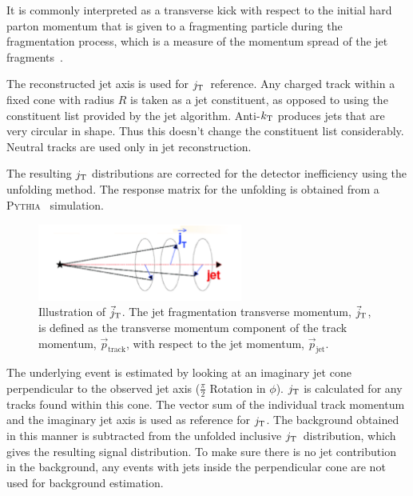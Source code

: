It is commonly interpreted as a transverse kick with respect to the initial hard parton momentum that is given to a fragmenting particle during the fragmentation process, which is a measure of the momentum spread of the jet fragments~\cite{}. 

The reconstructed jet axis is used for $j_{\rm T}$ reference. Any charged track within a fixed cone with radius $R$ is taken as a jet constituent, as opposed to using the constituent list provided by the jet algorithm. Anti-$k_{\rm T}$ produces jets that are very circular in shape. Thus this doesn't change the constituent list considerably. Neutral tracks are used only in jet reconstruction.
 
The resulting $j_{\rm T}$ distributions are corrected for the detector inefficiency using the unfolding method. The response matrix for the unfolding is obtained from a \textsc{Pythia}~\cite{introPythia81} simulation.
 
   \begin{figure}
    \begin{center}
      \includegraphics[width = 0.60\textwidth]{figures/jt_def}
    \end{center}
    \caption{Illustration of $\vec{j}_{\rm T}$. The jet fragmentation transverse momentum, $\vec{j}_{\rm T}$, is defined as the transverse momentum component of the track momentum, $\vec{p}_{\mathrm{track}}$, with respect to the jet momentum, $\vec{p}_{\mathrm{jet}}$.}
    \label{fig:jtdefinition}
  \end{figure}
 
The underlying event is estimated by looking at an imaginary jet cone perpendicular to the observed jet axis ($\frac{\pi}{2}$ Rotation in $\phi$). $j_{\rm T}$ is calculated for any tracks found within this cone. The vector sum of the individual track momentum and the imaginary jet axis is used as reference for $j_{\rm T}$. The background obtained in this manner is subtracted from the unfolded inclusive $j_{\rm T}$ distribution, which gives the resulting signal distribution. To make sure there is no jet contribution in the background, any events with jets inside the perpendicular cone are not used for background estimation.

 

